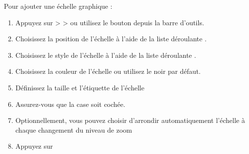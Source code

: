 Pour ajouter une échelle graphique :

\begin{enumerate}
\item Appuyez sur  >  >  ou utilisez le bouton  depuis la barre d'outils.
\item Choisissez la position de l'échelle à l'aide de la liste déroulante .
\item Choisissez le style de l'échelle à l'aide de la liste déroulante .
\item Choisissez la couleur de l'échelle  ou utilisez le noir par défaut.
\item Définissez la taille et l'étiquette de l'échelle 
\item Assurez-vous que la case  soit cochée.
\item Optionnellement, vous pouvez choisir d'arrondir automatiquement l'échelle 
  à chaque changement du niveau de zoom 
\item Appuyez sur  
\end{enumerate} 

